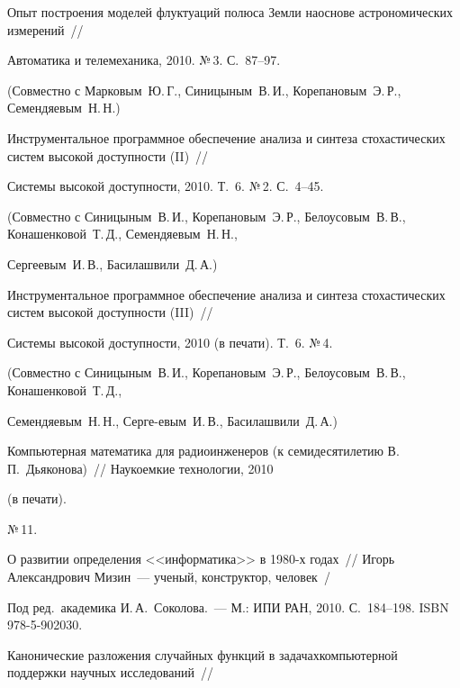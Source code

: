 Опыт построения моделей флуктуаций полюса Земли на\linebreak осно\-ве астрономических измерений~//


Автоматика и телеме\-ха\-ни\-ка, 2010. №\,3. С.~87--97.


(Совместно с Марковым~Ю.\,Г., Синицыным~В.\,И., Корепановым~Э.\,Р., Семендяевым~Н.\,Н.)





Инструментальное программное обеспечение анализа и синтеза стохастических систем высокой доступности (II)~//


Системы высокой доступности, 2010. Т.~6. №\,2. С.~4--45.


(Совместно с Синицыным~В.\,И., Корепановым~Э.\,Р., Белоусовым~В.\,В., Конашенковой~Т.\,Д., Семендяевым~Н.\,Н.,


Сергеевым~И.\,В., Басилашвили~Д.\,А.)





Инструментальное программное обеспечение анализа и синтеза стохастических систем высокой доступности (III)~//


Сис\-те\-мы высокой доступности, 2010 (в печати). Т.~6. №\,4.\linebreak


(Совместно с Синицыным~В.\,И., Корепановым~Э.\,Р., Белоусовым~В.\,В., Конашенковой~Т.\,Д.,


Семендяевым~Н.\,Н., Серге-\linebreak евым~И.\,В., Басилашвили~Д.\,А.)





Компьютерная математика для радиоинженеров (к семидесятилетию В.\,П.~Дьяконова)~// Наукоемкие технологии, 2010


 (в печати).


№\,11.





О развитии определения <<информатика>> в 1980-х годах~// Игорь Александрович Мизин~--- ученый, конструктор, человек~/


Под ред.\ академика И.\,А.~Соколова.~--- М.: ИПИ РАН, 2010. С.~184--198. ISBN 978-5-902030.





Канонические разложения случайных функций в задачах\linebreak компьютерной поддержки научных исследований~//


